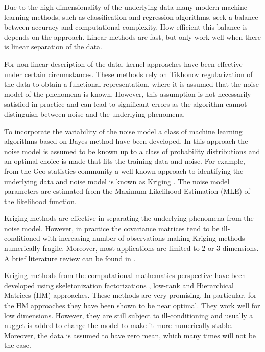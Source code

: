 \documentclass[11pt,final]{amsart}       %
\begin{document}

Due to the high dimensionality of the underlying data many modern
machine learning methods, such as classification and regression
algorithms, seek a balance between accuracy and computational
complexity. How efficient this balance is depends on the approach.
Linear methods are fast, but only work well when there is linear
separation of the data.

For non-linear description of the data, kernel approaches have been
effective under certain circumstances.  These methods rely on Tikhonov
regularization of the data to obtain a functional representation,
where it is assumed that the noise model of the phenomena is
known. However, this assumption is not necessarily satisfied in
practice and can lead to significant errors as the algorithm cannot
distinguish between noise and the underlying phenomena.


To incorporate the variability of the noise model a class of machine
learning algorithms based on Bayes method have been developed. In this
approach the noise model is assumed to be known up to a class of
probability distributions and an optimal choice is made that fits the
training data and noise. For example, from the Geo-statistics
community a well known approach to identifying the underlying data and
noise model is known as Kriging \cite{Nielsen2002}.  The noise model
parameters are estimated from the Maximum Likelihood Estimation (MLE)
of the likelihood function.

Kriging methods are effective in separating the underlying phenomena
from the noise model. However, in practice the covariance matrices
tend to be ill-conditioned with increasing number of observations
making Kriging methods numerically fragile. Moreover, most
applications are limited to 2 or 3 dimensions. A brief literature
review can be found in \cite{Castrillon2015}.

Kriging methods from the computational mathematics perspective have
been developed using skeletonization factorizations \cite{Minden2016},
low-rank \cite{nowak2013} and Hierarchical Matrices (HM)
\cite{khoromskij2009,Litvinenko2019,Geoga2020} approaches. These
methods are very promising. In particular, for the HM approaches they
have been shown to be near optimal. They work well for low dimensions.
However, they are still subject to ill-conditioning and usually a
nugget is added to change the model to make it more numerically
stable. Moreover, the data is assumed to have zero mean, which many
times will not be the case.
\end{document}

